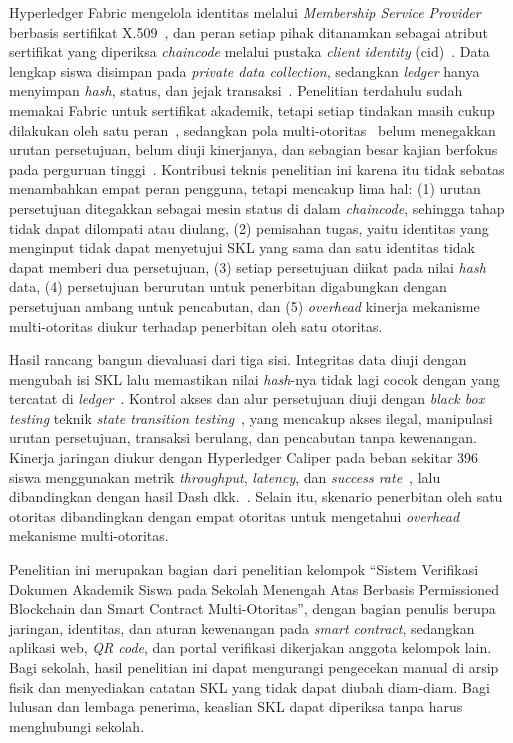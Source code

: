 Hyperledger Fabric mengelola identitas melalui \textit{Membership Service Provider} berbasis sertifikat X.509~\cite{FabricMSP}, dan peran setiap pihak ditanamkan sebagai atribut sertifikat yang diperiksa \textit{chaincode} melalui pustaka \textit{client identity} (cid)~\cite{FabricCID}. Data lengkap siswa disimpan pada \textit{private data collection}, sedangkan \textit{ledger} hanya menyimpan \textit{hash}, status, dan jejak transaksi~\cite{FabricPrivateData}. Penelitian terdahulu sudah memakai Fabric untuk sertifikat akademik, tetapi setiap tindakan masih cukup dilakukan oleh satu peran~\cite{Blanco2025Digital,Dash2025Hyperledger}, sedangkan pola multi-otoritas~\cite{Tariq2023Cerberus,AlHemairy2024UAE} belum menegakkan urutan persetujuan, belum diuji kinerjanya, dan sebagian besar kajian berfokus pada perguruan tinggi~\cite{Rustemi2023SLR,Pandari2026Blockchain}. Kontribusi teknis penelitian ini karena itu tidak sebatas menambahkan empat peran pengguna, tetapi mencakup lima hal: (1) urutan persetujuan ditegakkan sebagai mesin status di dalam \textit{chaincode}, sehingga tahap tidak dapat dilompati atau diulang, (2) pemisahan tugas, yaitu identitas yang menginput tidak dapat menyetujui SKL yang sama dan satu identitas tidak dapat memberi dua persetujuan, (3) setiap persetujuan diikat pada nilai \textit{hash} data, (4) persetujuan berurutan untuk penerbitan digabungkan dengan persetujuan ambang untuk pencabutan, dan (5) \textit{overhead} kinerja mekanisme multi-otoritas diukur terhadap penerbitan oleh satu otoritas.

Hasil rancang bangun dievaluasi dari tiga sisi. Integritas data diuji dengan mengubah isi SKL lalu memastikan nilai \textit{hash}-nya tidak lagi cocok dengan yang tercatat di \textit{ledger}~\cite{Blanco2025Digital}. Kontrol akses dan alur persetujuan diuji dengan \textit{black box testing} teknik \textit{state transition testing}~\cite{Putri2024BlackBox,Augenio2025StateTransition}, yang mencakup akses ilegal, manipulasi urutan persetujuan, transaksi berulang, dan pencabutan tanpa kewenangan. Kinerja jaringan diukur dengan Hyperledger Caliper pada beban sekitar 396 siswa menggunakan metrik \textit{throughput}, \textit{latency}, dan \textit{success rate}~\cite{Caliper}, lalu dibandingkan dengan hasil Dash dkk.~\cite{Dash2025Hyperledger}. Selain itu, skenario penerbitan oleh satu otoritas dibandingkan dengan empat otoritas untuk mengetahui \textit{overhead} mekanisme multi-otoritas.

Penelitian ini merupakan bagian dari penelitian kelompok ``Sistem Verifikasi Dokumen Akademik Siswa pada Sekolah Menengah Atas Berbasis Permissioned Blockchain dan Smart Contract Multi-Otoritas'', dengan bagian penulis berupa jaringan, identitas, dan aturan kewenangan pada \textit{smart contract}, sedangkan aplikasi web, \textit{QR code}, dan portal verifikasi dikerjakan anggota kelompok lain. Bagi sekolah, hasil penelitian ini dapat mengurangi pengecekan manual di arsip fisik dan menyediakan catatan SKL yang tidak dapat diubah diam-diam. Bagi lulusan dan lembaga penerima, keaslian SKL dapat diperiksa tanpa harus menghubungi sekolah.

